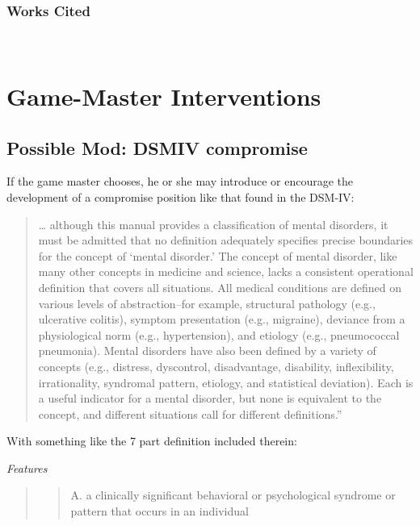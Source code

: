 \begin{refsection}
\subsubsection{Works Cited}
\label{workscited}

~\citep{Travers:1969dw}
~\citep{Bernard:1978vt}

\section{Game-Master Interventions}
\label{game-masterinterventions}

\subsection{Possible Mod: DSMIV compromise}
\label{possiblemod:dsmivcompromise}

If the game master chooses, he or she may introduce or encourage the development of a compromise position like that found in the DSM-IV: 

\begin{quote}

… although this manual provides a classification of mental disorders, it must be admitted that no definition adequately specifies precise boundaries for the concept of ‘mental disorder.’ The concept of mental disorder, like many other concepts in medicine and science, lacks a consistent operational definition that covers all situations. All medical conditions are defined on various levels of abstraction--for example, structural pathology (e.g., ulcerative colitis), symptom presentation (e.g., migraine), deviance from a physiological norm (e.g., hypertension), and etiology (e.g., pneumococcal pneumonia). Mental disorders have also been defined by a variety of concepts (e.g., distress, dyscontrol, disadvantage, disability, inflexibility, irrationality, syndromal pattern, etiology, and statistical deviation). Each is a useful indicator for a mental disorder, but none is equivalent to the concept, and different situations call for different definitions.” 
\end{quote}

With something like the 7 part definition included therein:

\emph{Features}

\begin{quote}

\begin{quote}

A. a clinically significant behavioral or psychological syndrome or pattern that occurs in an individual


\end{quote}
\end{quote}
\end{refsection}
